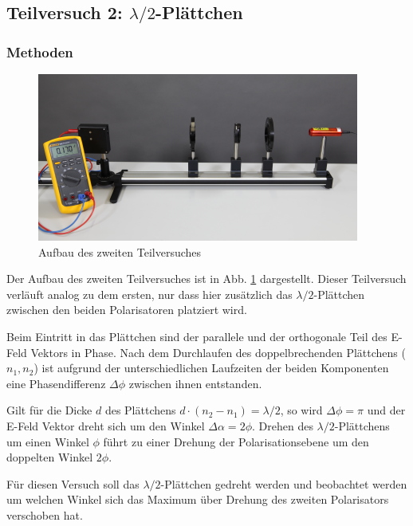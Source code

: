 \subsection{Teilversuch 2: $ \lambda  / 2 $-Plättchen}

	\subsubsection*{Methoden}
		
		\begin{figure}[ht]
			\centering
			\includegraphics[width=\textwidth]{bilder/LambdaHalbe.png}
			\caption{Aufbau des zweiten Teilversuches\cite{WWU}}
			\label{fig:LambdaHalbe}	
		\end{figure}
		Der Aufbau des zweiten Teilversuches ist in Abb. \ref{fig:LambdaHalbe} dargestellt.
		Dieser Teilversuch verläuft analog zu dem ersten, nur dass hier zusätzlich das $\lambda/2$-Plättchen zwischen den beiden Polarisatoren platziert wird.
		
		Beim Eintritt in das Plättchen sind der parallele und der orthogonale Teil des E-Feld Vektors in Phase. 
		Nach dem Durchlaufen des doppelbrechenden Plättchens ($n_1 , n_2$) ist aufgrund der unterschiedlichen Laufzeiten der beiden Komponenten eine Phasendifferenz $\Delta\phi$ zwischen ihnen entstanden.
		
		Gilt für die Dicke $d$ des Plättchens $d\cdot(n_2-n_1)=\lambda/2$, so wird $\Delta\phi=\pi$ und der E-Feld Vektor dreht sich um den Winkel $\Delta\alpha = 2\phi$.
		Drehen des $\lambda/2$-Plättchens um einen Winkel $\phi$ führt zu einer Drehung der Polarisationsebene um den doppelten Winkel $2\phi$.
		
		Für diesen Versuch soll das $\lambda/2$-Plättchen gedreht werden und beobachtet werden um welchen Winkel sich das Maximum über Drehung des zweiten Polarisators verschoben hat.
		
